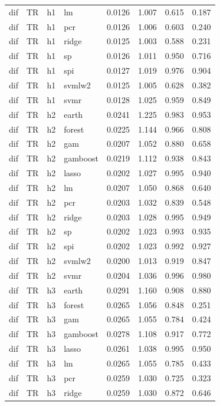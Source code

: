 \begin{ThreePartTable}
\begin{longtable}[t]{llclcccc}
dif & TR & h1 & lm & 0.0126 & 1.007 & 0.615 & 0.187\\
dif & TR & h1 & pcr & 0.0126 & 1.006 & 0.603 & 0.240\\
dif & TR & h1 & ridge & 0.0125 & 1.003 & 0.588 & 0.231\\
dif & TR & h1 & sp & 0.0126 & 1.011 & 0.950 & 0.716\\
dif & TR & h1 & spi & 0.0127 & 1.019 & 0.976 & 0.904\\
dif & TR & h1 & svmlw2 & 0.0125 & 1.005 & 0.628 & 0.382\\
dif & TR & h1 & svmr & 0.0128 & 1.025 & 0.959 & 0.849\\
\addlinespace
dif & TR & h2 & earth & 0.0241 & 1.225 & 0.983 & 0.953\\
dif & TR & h2 & forest & 0.0225 & 1.144 & 0.966 & 0.808\\
dif & TR & h2 & gam & 0.0207 & 1.052 & 0.880 & 0.658\\
dif & TR & h2 & gamboost & 0.0219 & 1.112 & 0.938 & 0.843\\
dif & TR & h2 & lasso & 0.0202 & 1.027 & 0.995 & 0.940\\
dif & TR & h2 & lm & 0.0207 & 1.050 & 0.868 & 0.640\\
dif & TR & h2 & pcr & 0.0203 & 1.032 & 0.839 & 0.548\\
dif & TR & h2 & ridge & 0.0203 & 1.028 & 0.995 & 0.949\\
dif & TR & h2 & sp & 0.0202 & 1.023 & 0.993 & 0.935\\
dif & TR & h2 & spi & 0.0202 & 1.023 & 0.992 & 0.927\\
dif & TR & h2 & svmlw2 & 0.0200 & 1.013 & 0.919 & 0.847\\
dif & TR & h2 & svmr & 0.0204 & 1.036 & 0.996 & 0.980\\
\addlinespace
dif & TR & h3 & earth & 0.0291 & 1.160 & 0.908 & 0.880\\
dif & TR & h3 & forest & 0.0265 & 1.056 & 0.848 & 0.251\\
dif & TR & h3 & gam & 0.0265 & 1.055 & 0.784 & 0.424\\
dif & TR & h3 & gamboost & 0.0278 & 1.108 & 0.917 & 0.772\\
dif & TR & h3 & lasso & 0.0261 & 1.038 & 0.995 & 0.950\\
dif & TR & h3 & lm & 0.0265 & 1.055 & 0.785 & 0.433\\
dif & TR & h3 & pcr & 0.0259 & 1.030 & 0.725 & 0.323\\
dif & TR & h3 & ridge & 0.0259 & 1.030 & 0.872 & 0.646\\

\end{longtable}
\end{ThreePartTable}
